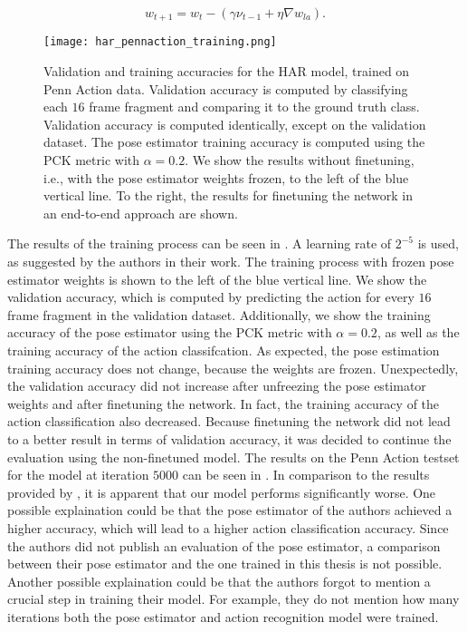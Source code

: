 \begin{equation}
    w_{t+1} = w_t - (\gamma \nu_{t-1} + \eta \nabla w_{la}).
\end{equation}

\begin{figure}[htb!]
    \centering
    \texttt{[image: har\_pennaction\_training.png]}
    \caption{Validation and training accuracies for the HAR model, trained on Penn Action data. Validation accuracy is computed by classifying each $16$ frame fragment and comparing it to the ground truth class. Validation accuracy is computed identically, except on the validation dataset. The pose estimator training accuracy is computed using the PCK metric with $\alpha = 0.2$. We show the results without finetuning, i.e., with the pose estimator weights frozen, to the left of the blue vertical line. To the right, the results for finetuning the network in an end-to-end approach are shown.}
    \label{fig:har_pennaction_results}
\end{figure}

The results of the training process can be seen in .
A learning rate of $2^{-5}$ is used, as suggested by the authors in their work.
The training process with frozen pose estimator weights is shown to the left of the blue vertical line.
We show the validation accuracy, which is computed by predicting the action for every $16$ frame fragment in the validation dataset.
Additionally, we show the training accuracy of the pose estimator using the PCK metric with $\alpha = 0.2$, as well as the training accuracy of the action classifcation.
As expected, the pose estimation training accuracy does not change, because the weights are frozen.
Unexpectedly, the validation accuracy did not increase after unfreezing the pose estimator weights and after finetuning the network.
In fact, the training accuracy of the action classification also decreased.
Because finetuning the network did not lead to a better result in terms of validation accuracy, it was decided to continue the evaluation using the non-finetuned model.
The results on the Penn Action testset for the model at iteration $5000$ can be seen in .
In comparison to the results provided by \cite{luvizon_2d/3d_2018}, it is apparent that our model performs significantly worse.
One possible explaination could be that the pose estimator of the authors achieved a higher accuracy, which will lead to a higher action classification accuracy.
Since the authors did not publish an evaluation of the pose estimator, a comparison between their pose estimator and the one trained in this thesis is not possible.
Another possible explaination could be that the authors forgot to mention a crucial step in training their model.
For example, they do not mention how many iterations both the pose estimator and action recognition model were trained.

